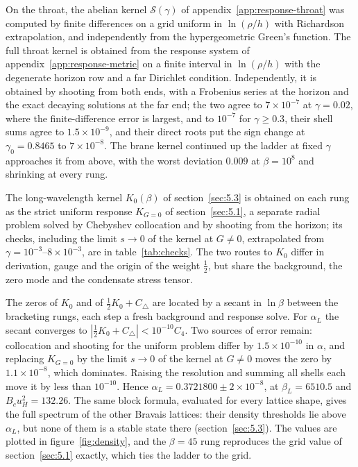 On the throat, the abelian kernel $\mathcal{S}(\gamma)$ of
appendix~\ref{app:response-throat} was computed by finite differences on a
grid uniform in $\ln(\rho/h)$ with Richardson extrapolation, and
independently from the hypergeometric Green's function. The full throat
kernel is obtained from the response system of
appendix~\ref{app:response-metric} on a finite interval in $\ln(\rho/h)$ with the
degenerate horizon row and a far Dirichlet condition. Independently, it is
obtained by shooting from both ends, with a Frobenius series at the horizon
and the exact decaying solutions at the far end; the two agree to
$7\times10^{-7}$ at $\gamma = 0.02$, where the finite-difference error is
largest, and to $10^{-7}$ for $\gamma \ge 0.3$, their shell sums agree to
$1.5\times10^{-9}$, and
their direct roots put the sign change at $\gamma_0 = 0.8465$ to
$7\times10^{-8}$. The brane kernel
continued up the ladder at fixed $\gamma$ approaches it from above, with
the worst deviation $0.009$ at $\beta = 10^8$ and shrinking at every rung.

The long-wavelength kernel $K_0(\beta)$ of section~\ref{sec:5.3} is
obtained on each rung as the strict uniform response $K_{G=0}$ of
section~\ref{sec:5.1}, a separate radial problem solved by Chebyshev
collocation and by shooting from the horizon; its checks, including the
limit $s \to 0$ of the kernel at $G \neq 0$, extrapolated from
$\gamma = 10^{-3}$--$8\times10^{-3}$, are in table~\ref{tab:checks}. The two routes to $K_0$ differ in derivation, gauge and the
origin of the weight $\tfrac12$, but share the background, the zero mode
and the condensate stress tensor.

The zeros of $K_0$ and of $\tfrac12K_0 + C_\triangle$ are located by a
secant in $\ln\beta$ between the bracketing rungs, each step a fresh
background and response solve. For $\alpha_L$ the secant converges to
$|\tfrac12K_0 + C_\triangle| < 10^{-10}C_4$. Two sources of error remain:
collocation and shooting for the uniform problem differ by
$1.5\times10^{-10}$ in $\alpha$, and replacing $K_{G=0}$ by the limit
$s \to 0$ of the kernel at $G \neq 0$ moves the zero by
$1.1\times10^{-8}$, which dominates. Raising the resolution and summing
all shells each move it by less than $10^{-10}$.
Hence $\alpha_L = 0.3721800 \pm 2\times10^{-8}$, at $\beta_L = 6510.5$ and
$B_cu_H^2 = 132.26$. The same block formula, evaluated for every
lattice shape, gives the full spectrum of the other Bravais lattices: their
density thresholds lie above $\alpha_L$, but none of them is a stable
state there (section~\ref{sec:5.3}). The values
are plotted in figure~\ref{fig:density}, and the $\beta = 45$ rung
reproduces the grid value of section~\ref{sec:5.1} exactly, which ties the
ladder to the grid.
